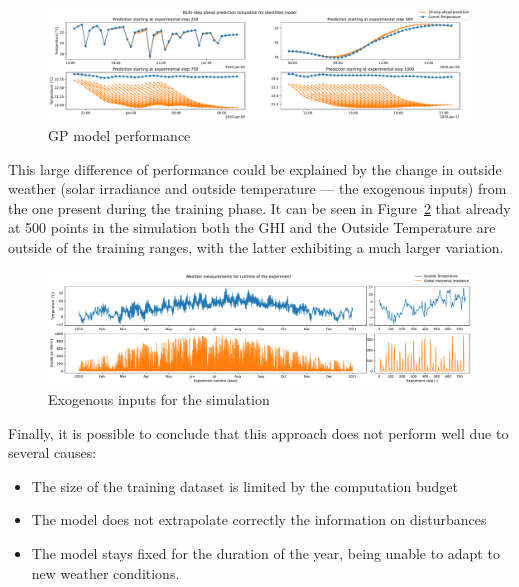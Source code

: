 \begin{figure}[ht]
    \centering
    \includegraphics[width =
    \textwidth]{Plots/4_GP_480pts_12_averageYear_first_model_performance.pdf}
    \caption{GP model performance}
    \label{fig:GP_first_model_performance}
\end{figure}

This large difference of performance could be explained by the change in outside
weather (solar irradiance and outside temperature --- the exogenous inputs) from
the one present during the training phase. It can be seen in
Figure~\ref{fig:Dataset_outside_temperature} that already at 500 points in the
simulation both the GHI and the Outside Temperature are outside of the training
ranges, with the latter exhibiting a much larger variation. 


\begin{figure}[ht]
    \centering
    \includegraphics[width =
    \textwidth]{Plots/Exogenous_inputs_fullyear.pdf}
    \caption{Exogenous inputs for the simulation}
    \label{fig:Dataset_outside_temperature}
\end{figure}

Finally, it is possible to conclude that this approach does not perform well due
to several causes:

\begin{itemize}
    \item The size of the training dataset is limited by the computation budget
    \item The model does not extrapolate correctly the information on
        disturbances
    \item The model stays fixed for the duration of the year, being unable to
        adapt to new weather conditions.
\end{itemize}

